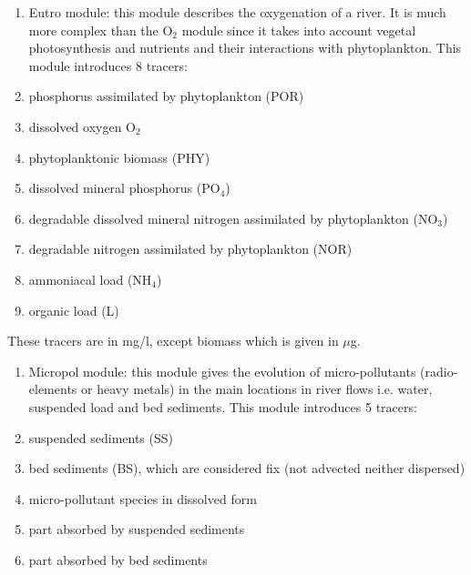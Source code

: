 \begin{enumerate}
\item  Eutro module:  this module describes the oxygenation of a river. It is much more complex than the O${}_{2}$ module since it takes into account vegetal photosynthesis and nutrients and their interactions with phytoplankton. This module introduces 8 tracers:

\item  phosphorus assimilated by phytoplankton (POR)

\item  dissolved oxygen O${}_{2}$

\item  phytoplanktonic biomass (PHY)

\item  dissolved mineral phosphorus (PO${}_{4}$)

\item  degradable dissolved mineral nitrogen assimilated by phytoplankton (NO${}_{3}$)

\item  degradable nitrogen assimilated by phytoplankton (NOR)

\item  ammoniacal load (NH${}_{4}$)

\item  organic load (L)
\end{enumerate}

     These tracers are in mg/l, except biomass which is given in $\mu$g.

\begin{enumerate}
\item  Micropol module:  this module gives the evolution of micro-pollutants (radio-elements or heavy metals) in the main locations in river flows i.e. water, suspended load and bed sediments. This module introduces 5 tracers:

\item  suspended sediments (SS)

\item  bed sediments (BS), which are considered fix (not advected neither dispersed)

\item  micro-pollutant species in dissolved form

\item  part absorbed by suspended sediments

\item  part absorbed by bed sediments
\end{enumerate}



